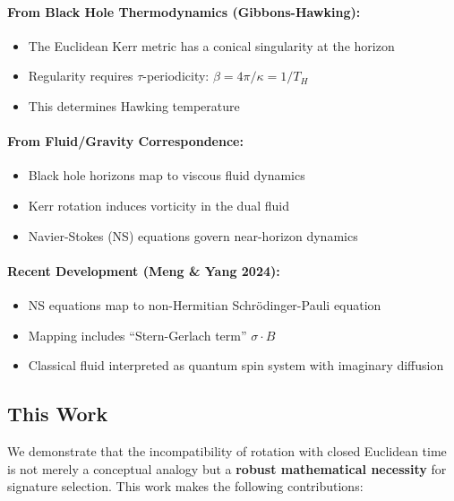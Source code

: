 \documentclass[11pt]{article}
\begin{document}
\paragraph{From Black Hole Thermodynamics (Gibbons-Hawking):}
\begin{itemize}
\item The Euclidean Kerr metric has a conical singularity at the horizon
\item Regularity requires $\tau$-periodicity: $\beta = 4\pi/\kappa = 1/T_H$
\item This determines Hawking temperature
\end{itemize}

\paragraph{From Fluid/Gravity Correspondence:}
\begin{itemize}
\item Black hole horizons map to viscous fluid dynamics
\item Kerr rotation induces vorticity in the dual fluid
\item Navier-Stokes (NS) equations govern near-horizon dynamics
\end{itemize}

\paragraph{Recent Development (Meng \& Yang 2024):}
\begin{itemize}
\item NS equations map to non-Hermitian Schrödinger-Pauli equation
\item Mapping includes ``Stern-Gerlach term'' $\sigma \cdot B$
\item Classical fluid interpreted as quantum spin system with imaginary diffusion
\end{itemize}

\subsection{This Work}

We demonstrate that the incompatibility of rotation with closed Euclidean time is not merely a conceptual analogy but a \textbf{robust mathematical necessity} for signature selection. This work makes the following contributions:
\end{document}

